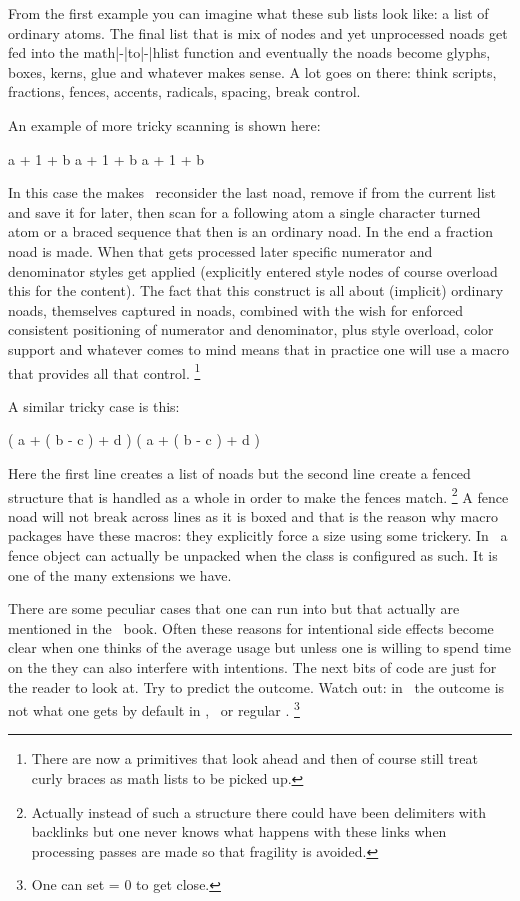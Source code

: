 From the first example you can imagine what these sub lists look like: a list of
ordinary atoms. The final list that is mix of nodes and yet unprocessed noads get
fed into the math|-|to|-|hlist function and eventually the noads become glyphs,
boxes, kerns, glue and whatever makes sense. A lot goes on there: think scripts,
fractions, fences, accents, radicals, spacing, break control.

An example of more tricky scanning is shown here:

\starttyping
a +   1    + b
a +  {1}  + b
a + {{1}} + b
\stoptyping

In this case the \type {\over} makes \TEX\ reconsider the last noad, remove if
from the current list and save it for later, then scan for a following atom a
single character turned atom or a braced sequence that then is an ordinary noad.
In the end a fraction noad is made. When that gets processed later specific
numerator and denominator styles get applied (explicitly entered style nodes of
course overload this for the content). The fact that this construct is all about
(implicit) ordinary noads, themselves captured in noads, combined with the wish
for enforced consistent positioning of numerator and denominator, plus style
overload, color support and whatever comes to mind means that in practice one
will use a \type {\frac} macro that provides all that control. \footnote {There
are now a \type {\Uover} primitives that look ahead and then of course still
treat curly braces as math lists to be picked up.}

A similar tricky case is this:

\starttyping
      ( a +       ( b - c        ) + d        )
\left ( a + \left ( b - c \right ) + d \right )
\stoptyping

Here the first line creates a list of noads but the second line create a fenced
structure that is handled as a whole in order to make the fences match. \footnote
{Actually instead of such a structure there could have been delimiters with
backlinks but one never knows what happens with these links when processing
passes are made so that fragility is avoided.} A fence noad will not break across
lines as it is boxed and that is the reason why macro packages have these \type
{\bigg} macros: they explicitly force a size using some trickery. In \LUAMETATEX\
a fence object can actually be unpacked when the class is configured as such. It
is one of the many extensions we have.

There are some peculiar cases that one can run into but that actually are
mentioned in the \TEX\ book. Often these reasons for intentional side effects
become clear when one thinks of the average usage but unless one is willing to
spend time on the \quote {fine points of math} they can also interfere with
intentions. The next bits of code are just for the reader to look at. Try to
predict the outcome. Watch out: in \LMTX\ the outcome is not what one gets by
default in \LUATEX, \PDFTEX\ or regular \TEX. \footnote {One can set \typ
{\mathgroupingmode = 0} to get close.}

